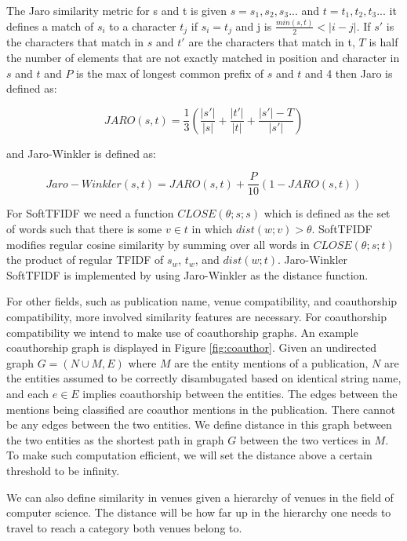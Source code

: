 \documentclass[twocolumn,letterpaper]{article}
\begin{document}
The Jaro similarity metric for s and t is given $s= s_1,s_2,s_3...$ and $t= t_1,t_2,t_3...$ it defines a match of $s_i$ to a character $t_j$ if $s_i=t_j$ and j is $\frac{min(s,t)}{2} < |i-j|$. If $s'$ is the characters that match in $s$ and $t'$ are the characters that match in t, $T$ is half the number of elements that are not exactly matched in position and character in $s$ and $t$ and $P$ is the max of longest common prefix of $s$ and $t$ and 4 then Jaro is defined as:
\begin{center}
\[
	JARO(s,t) = \frac{1}{3}\left(\frac{|s'|}{|s|}+\frac{|t'|}{|t|}+\frac{|s'|-T}{|s'|}\right)
\]
\end{center}

and Jaro-Winkler is defined as:
\begin{center}
\[
	Jaro-Winkler(s,t) = JARO(s,t) + \frac{P}{10}(1-JARO(s,t))
\]
\end{center}

For SoftTFIDF we need a function $CLOSE(\theta; s; s)$ which is defined as the set of words such that there is some $v \in t$ in which $dist(w; v) > \theta$. SoftTFIDF modifies regular cosine similarity by summing over all words in $CLOSE(\theta; s; t)$ the product of regular TFIDF of $s_w$, $t_w$, and $dist(w;t)$. Jaro-Winkler SoftTFIDF is implemented by using Jaro-Winkler as the distance function. 

For other fields, such as publication name, venue compatibility, and coauthorship compatibility, more involved similarity features are necessary. For coauthorship compatibility we intend to make use of coauthorship graphs. An example coauthorship graph is displayed in Figure \ref{fig:coauthor}. Given an undirected graph $G=(N \cup M,E)$ where $M$ are the entity mentions of a publication, $N$ are the entities assumed to be correctly disambugated based on identical string name, and each $e \in E$ implies coauthorship between the entities. The edges between the mentions being classified are coauthor mentions in the publication. There cannot be any edges between the two entities. We define distance in this graph between the two entities as the shortest path in graph $G$ between the two vertices in $M$. To make such computation efficient, we will set the distance above a certain threshold to be infinity.

We can also define similarity in venues given a hierarchy of venues in the field of computer science. The distance will be how far up in the hierarchy one needs to travel to reach a category both venues belong to. 
 
\end{document}
